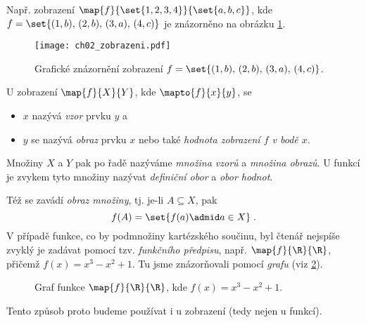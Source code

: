 Např. zobrazení $\map{f}{\set{1,2,3,4}}{\set{a,b,c}}$, kde $f=\set{(1,b),\,(2,b),\,(3,a),\,(4,c)}$ je znázorněno na obrázku \ref{fig:zobrazeni}.
\begin{figure}[h]
    \centering
    \texttt{[image: ch02\_zobrazeni.pdf]}
    \caption{Grafické znázornění zobrazení $f=\set{(1,b),\,(2,b),\,(3,a),\,(4,c)}$.}
    \label{fig:zobrazeni}
\end{figure}
U zobrazení $\map{f}{X}{Y}$, kde $\mapto{f}{x}{y}$, se
\begin{itemize}
    \item $x$ nazývá \emph{vzor} prvku $y$ a
    \item $y$ se nazývá \emph{obraz} prvku $x$ nebo také \emph{hodnota zobrazení $f$ v bodě $x$}.
\end{itemize}
Množiny $X$ a $Y$ pak po řadě nazýváme \emph{množina vzorů} a \emph{množina obrazů}. U funkcí je zvykem tyto množiny nazývat \emph{definiční obor} a \emph{obor hodnot}.\par
Též se zavádí \emph{obraz množiny}, tj. je-li $A\subseteq X$, pak
\begin{equation*}
    f(A)=\set{f(a) \admid a\in X}\; .
\end{equation*}
V případě funkce, co by podmnožiny kartézského součinu, byl čtenář nejspíše zvyklý je zadávat pomocí tzv. \emph{funkčního předpisu}, např. $\map{f}{\R}{\R}$, přičemž $f(x)=x^3-x^2+1$. Tu jsme znázorňovali pomocí \emph{grafu} (viz \ref{fig:funkce_graf}).
\begin{figure}[h]
    \centering
    
    \caption{Graf funkce $\map{f}{\R}{\R}$, kde $f(x)=x^3-x^2+1$.}
    \label{fig:funkce_graf}
\end{figure}
Tento způsob proto budeme používat i u zobrazení (tedy nejen u funkcí).
\medskip


